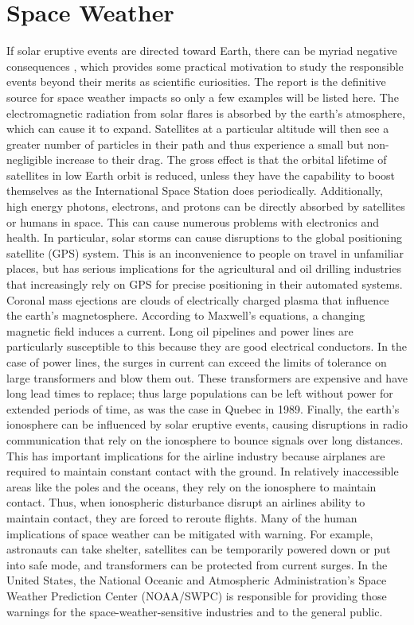 \section{Space Weather}
\label{sec:spaceweather}
If solar eruptive events are directed toward Earth, there can be myriad negative consequences \citep{NRC2008}, which provides some practical motivation to study the responsible events beyond their merits as scientific curiosities. The \citet{NRC2008} report is the definitive source for space weather impacts so only a few examples will be listed here. The electromagnetic radiation from solar flares is absorbed by the earth's atmosphere, which can cause it to expand. Satellites at a particular altitude will then see a greater number of particles in their path and thus experience a small but non-negligible increase to their drag. The gross effect is that the orbital lifetime of satellites in low Earth orbit is reduced, unless they have the capability to boost themselves as the International Space Station does periodically. Additionally, high energy photons, electrons, and protons can be directly absorbed by satellites or humans in space. This can cause numerous problems with electronics and health. In particular, solar storms can cause disruptions to the global positioning satellite (GPS) system. This is an inconvenience to people on travel in unfamiliar places, but has serious implications for the agricultural and oil drilling industries that increasingly rely on GPS for precise positioning in their automated systems. Coronal mass ejections are clouds of electrically charged plasma that influence the earth's magnetosphere. According to Maxwell's equations, a changing magnetic field induces a current. Long oil pipelines and power lines are particularly susceptible to this because they are good electrical conductors. In the case of power lines, the surges in current can exceed the limits of tolerance on large transformers and blow them out. These transformers are expensive and have long lead times to replace; thus large populations can be left without power for extended periods of time, as was the case in Quebec in 1989. Finally, the earth's ionosphere can be influenced by solar eruptive events, causing disruptions in radio communication that rely on the ionosphere to bounce signals over long distances. This has important implications for the airline industry because airplanes are required to maintain constant contact with the ground. In relatively inaccessible areas like the poles and the oceans, they rely on the ionosphere to maintain contact. Thus, when ionospheric disturbance disrupt an airlines ability to maintain contact, they are forced to reroute flights. Many of the human implications of space weather can be mitigated with warning. For example, astronauts can take shelter, satellites can be temporarily powered down or put into safe mode, and transformers can be protected from current surges. In the United States, the National Oceanic and Atmospheric Administration's Space Weather Prediction Center (NOAA/SWPC) is responsible for providing those warnings for the space-weather-sensitive industries and to the general public. 

